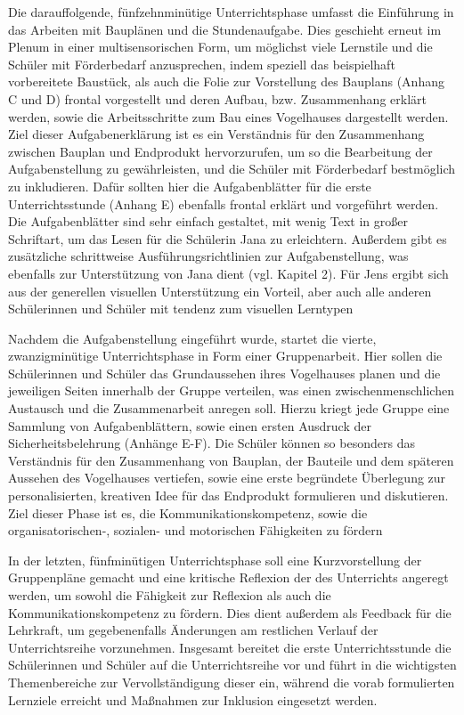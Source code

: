 \documentclass[12pt]{article}
\begin{document}
Die darauffolgende, fünfzehnminütige Unterrichtsphase umfasst die Einführung in das Arbeiten mit Bauplänen und die Stundenaufgabe. Dies geschieht erneut im Plenum in einer multisensorischen Form, um möglichst viele Lernstile und die Schüler mit Förderbedarf anzusprechen, indem speziell das beispielhaft vorbereitete Baustück, als auch die Folie zur Vorstellung des Bauplans (Anhang C und D) frontal vorgestellt und deren Aufbau, bzw. Zusammenhang erklärt werden, sowie die Arbeitsschritte zum Bau eines Vogelhauses dargestellt werden. Ziel dieser Aufgabenerklärung ist es ein Verständnis für den Zusammenhang zwischen Bauplan und Endprodukt hervorzurufen, um so die Bearbeitung der Aufgabenstellung zu gewährleisten, und die Schüler mit Förderbedarf bestmöglich zu inkludieren. Dafür sollten hier die Aufgabenblätter für die erste Unterrichtsstunde (Anhang E) ebenfalls frontal erklärt und vorgeführt werden. Die Aufgabenblätter sind sehr einfach gestaltet, mit wenig Text in großer Schriftart, um das Lesen für die Schülerin Jana zu erleichtern. Außerdem gibt es zusätzliche schrittweise Ausführungsrichtlinien zur Aufgabenstellung, was ebenfalls zur Unterstützung von Jana dient (vgl. Kapitel 2). Für Jens ergibt sich aus der generellen visuellen Unterstützung ein Vorteil, aber auch alle anderen Schülerinnen und Schüler mit tendenz zum visuellen Lerntypen 

Nachdem die Aufgabenstellung eingeführt wurde, startet die vierte, zwanzigminütige Unterrichtsphase in Form einer Gruppenarbeit. Hier sollen die Schülerinnen und Schüler das Grundaussehen ihres Vogelhauses planen und die jeweiligen Seiten innerhalb der Gruppe verteilen, was einen zwischenmenschlichen Austausch und die Zusammenarbeit anregen soll. Hierzu kriegt jede Gruppe eine Sammlung von Aufgabenblättern, sowie einen ersten Ausdruck der Sicherheitsbelehrung (Anhänge E-F). Die Schüler können so besonders das Verständnis für den Zusammenhang von Bauplan, der Bauteile und dem späteren Aussehen des Vogelhauses vertiefen, sowie eine erste begründete Überlegung zur personalisierten, kreativen Idee für das Endprodukt formulieren und diskutieren. Ziel dieser Phase ist es, die Kommunikationskompetenz, sowie die organisatorischen-, sozialen- und motorischen Fähigkeiten zu fördern 

In der letzten, fünfminütigen Unterrichtsphase soll eine Kurzvorstellung der Gruppenpläne gemacht und eine kritische Reflexion der des Unterrichts angeregt werden, um sowohl die Fähigkeit zur Reflexion als auch die Kommunikationskompetenz zu fördern. Dies dient außerdem als Feedback für die Lehrkraft, um gegebenenfalls Änderungen am restlichen Verlauf der Unterrichtsreihe vorzunehmen. Insgesamt bereitet die erste Unterrichtsstunde die Schülerinnen und Schüler auf die Unterrichtsreihe vor und führt in die wichtigsten Themenbereiche zur Vervollständigung dieser ein, während die vorab formulierten Lernziele erreicht und Maßnahmen zur Inklusion eingesetzt werden.
\end{document}
